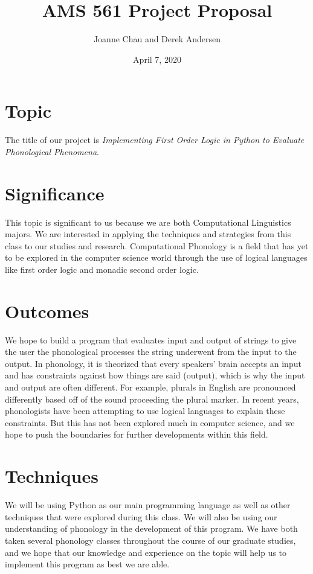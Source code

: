 \documentclass{article}
\title{AMS 561 Project Proposal}
\author{Joanne Chau and Derek Andersen}
\date{April 7, 2020}
\begin{document}
\maketitle

\section*{Topic}

The title of our project is \textit{Implementing First Order Logic in Python to Evaluate Phonological Phenomena}.

\section*{Significance}

This topic is significant to us because we are both Computational Linguistics majors. We are interested in applying the techniques and strategies from this class to our studies and research. Computational Phonology is a field that has yet to be explored in the computer science world through the use of logical languages like first order logic and monadic second order logic.  

\section*{Outcomes}

We hope to build a program that evaluates input and output of strings to give the user the phonological processes the string underwent from the input to the output. In phonology, it is theorized that every speakers' brain accepts an input and has constraints against how things are said (output), which is why the input and output are often different. For example, plurals in English are pronounced differently based off of the sound proceeding the plural marker. In recent years, phonologists have been attempting to use logical languages to explain these constraints. But this has not been explored much in computer science, and we hope to push the boundaries for further developments within this field.

\section*{Techniques}

We will be using Python as our main programming language as well as other techniques that were explored during this class. We will also be using our understanding of phonology in the development of this program. We have both taken several phonology classes throughout the course of our graduate studies, and we hope that our knowledge and experience on the topic will help us to implement this program as best we are able.
\end{document}
